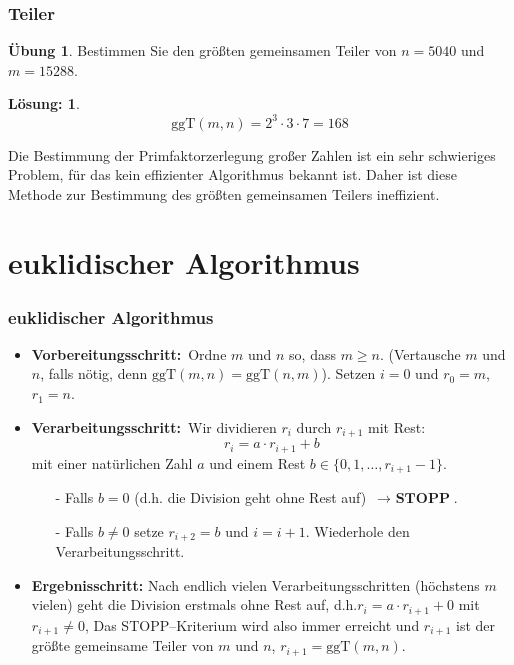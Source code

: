 \documentclass[hyperref={pdfpagelabels=false}]{beamer}
\theoremstyle{plain}%
\theoremstyle{definition}
\newtheorem*{uebung}{Übung}
\newtheorem*{sol}{Lösung:}
\theoremstyle{remark}
\begin{document}
\begin{frame}
\frametitle{Teiler}

\begin{uebung}
Bestimmen Sie den größten gemeinsamen Teiler von $n = 5040$ und $m = 15288$.
\end{uebung}

\pause \pause 

\bigbreak

\begin{sol}
	$$ \mathrm{ggT}(m,n) = 2^3 \cdot 3 \cdot 7 = 168 $$
\end{sol}

\pause 

Die Bestimmung der Primfaktorzerlegung großer Zahlen ist ein sehr schwieriges Problem, 
für das kein effizienter Algorithmus bekannt ist. Daher ist diese Methode zur Bestimmung 
des größten gemeinsamen Teilers ineffizient.

\end{frame}

\section{euklidischer Algorithmus}

\begin{frame}
\frametitle{euklidischer Algorithmus}

\begin{itemize} 
\item \textbf{Vorbereitungsschritt:\,} Ordne $m$ und $n$ so, dass $m \geq n$. (Vertausche  
$m$ und $n$, falls n\"otig, denn $\textrm{ggT}(m,n) = \textrm{ggT}(n,m)$). Setzen $i = 0$ und 
$r_0 = m$, $r_1 = n$.
\item<2-> \textbf{Verarbeitungsschritt:\,} Wir dividieren $r_i$ durch $r_{i+1}$ mit Rest:
  $$ r_i = a \cdot r_{i+1} + b $$
mit einer nat\"urlichen Zahl $a$ und einem Rest $b \in \{0, 1, \ldots, r_{i+1} - 1 \}$.
\begin{itemize}
\item[-] Falls $b = 0$ (d.h. die Division geht ohne Rest auf) $\, \longrightarrow \textbf{ STOPP}$.
\item[-] Falls $b \neq 0$ setze $r_{i+2} = b$ und $i = i+1$. Wiederhole den Verarbeitungsschritt.
\end{itemize}
\item<3-> \textbf{Ergebnisschritt:} Nach endlich vielen Verarbeitungsschritten (h\"ochstens $m$ vielen) geht die 
Division erstmals ohne Rest auf, d.h.$ r_i = a \cdot r_{i+1} + 0 $
mit $r_{i+1} \neq 0$, Das STOPP--Kriterium wird also immer erreicht und $r_{i+1}$ ist der gr\"o{\ss}te gemeinsame 
Teiler von $m$ und $n$, $r_{i+1} = \textrm{ggT}(m,n)$.
\end{itemize}


\end{frame}
\end{document}
